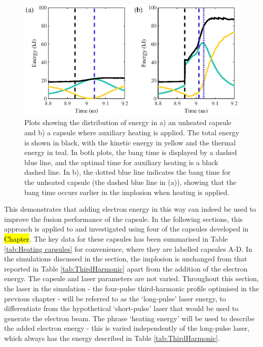 \begin{figure}[ht]
\centering
\includegraphics{figures/FurtherSims/EnergyDist.eps}
\caption{Plots showing the distribution of energy in a) an unheated capsule and b) a capsule where auxiliary heating is applied. The total energy is shown in black, with the kinetic energy in yellow and the thermal energy in teal. In both plots, the bang time is displayed by a dashed blue line, and the optimal time for auxiliary heating is a black dashed line. In b), the dotted blue line indicates the bang time for the unheated capsule (the dashed blue line in (a)), showing that the bang time occurs earlier in the implosion when heating is applied.}
\label{fig:EnergyDist}
\end{figure}

This demonstrates that adding electron energy in this way can indeed be used to improve the fusion performance of the capsule. In the following sections, this approach is applied to and investigated using four of the capsules developed in \hl{Chapter}. The key data for these capsules has been summarised in Table  \ref{tab:Heating capsules} for convenience, where they are labelled capsules A-D. In the simulations discussed in the section, the implosion is unchanged from that reported in Table \ref{tab:ThirdHarmonic} apart from the addition of the electron energy. The capsule and laser parameters are not varied. Throughout this section, the laser in the simulation - the four-pulse third-harmonic profile optimised in the previous chapter - will be referred to as the `long-pulse' laser energy, to differentiate from the hypothetical `short-pulse' laser that would be used to generate the electron beam. The phrase `heating energy' will be used to describe the added electron energy - this is varied independently of the long-pulse laser, which always has the energy described in Table \ref{tab:ThirdHarmonic}.

